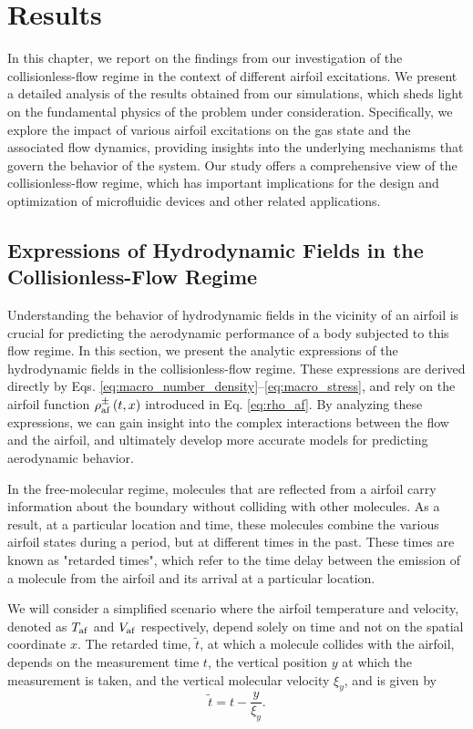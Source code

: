 \chapter{Results}
In this chapter, we report on the findings from our investigation of the collisionless-flow regime in the context of different airfoil excitations. We present a detailed analysis of the results obtained from our simulations, which sheds light on the fundamental physics of the problem under consideration. Specifically, we explore the impact of various airfoil excitations on the gas state and the associated flow dynamics, providing insights into the underlying mechanisms that govern the behavior of the system. Our study offers a comprehensive view of the collisionless-flow regime, which has important implications for the design and optimization of microfluidic devices and other related applications.

\section{Expressions of Hydrodynamic Fields in the Collisionless-Flow Regime}
Understanding the behavior of hydrodynamic fields in the vicinity of an airfoil is crucial for predicting the aerodynamic performance of a body subjected to this flow regime. In this section, we present the analytic expressions of the hydrodynamic fields in the collisionless-flow regime. These expressions are derived directly by Eqs. \ref{eq:macro_number_density}--\ref{eq:macro_stress}, and rely on the airfoil function $\rho_{\mathrm{af}}^\pm\left(t,x\right)$ introduced in Eq. \ref{eq:rho_af}. By analyzing these expressions, we can gain insight into the complex interactions between the flow and the airfoil, and ultimately develop more accurate models for predicting aerodynamic behavior.

In the free-molecular regime, molecules that are reflected from a airfoil carry information about the boundary without colliding with other molecules. As a result, at a particular location and time, these molecules combine the various airfoil states during a period, but at different times in the past. These times are known as "retarded times", which refer to the time delay between the emission of a molecule from the airfoil and its arrival at a particular location.

We will consider a simplified scenario where the airfoil temperature and velocity, denoted as $T_{\mathrm{af}}$ and $V_{\mathrm{af}}$ respectively, depend solely on time and not on the spatial coordinate $x$. The retarded time, $\tilde{t}$, at which a molecule collides with the airfoil, depends on the measurement time $t$, the vertical position $y$ at which the measurement is taken, and the vertical molecular velocity $\xi_y$, and is given by $$\tilde{t}=t-\frac{y}{\xi_y}.$$
